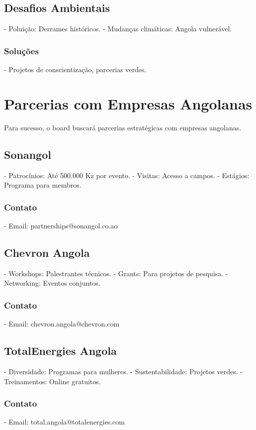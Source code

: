 \documentclass[12pt]{article}
\begin{document}
\subsection{Desafios Ambientais}
- Poluição: Derrames históricos.
- Mudanças climáticas: Angola vulnerável.

\subsubsection{Soluções}
- Projetos de conscientização, parcerias verdes.

\section{Parcerias com Empresas Angolanas}

Para sucesso, o board buscará parcerias estratégicas com empresas angolanas.

\subsection{Sonangol}
- Patrocínios: Até 500.000 Kz por evento.
- Visitas: Acesso a campos.
- Estágios: Programa para membros.

\subsubsection{Contato}
- Email: partnerships@sonangol.co.ao

\subsection{Chevron Angola}
- Workshops: Palestrantes técnicos.
- Grants: Para projetos de pesquisa.
- Networking: Eventos conjuntos.

\subsubsection{Contato}
- Email: chevron.angola@chevron.com

\subsection{TotalEnergies Angola}
- Diversidade: Programas para mulheres.
- Sustentabilidade: Projetos verdes.
- Treinamentos: Online gratuitos.

\subsubsection{Contato}
- Email: total.angola@totalenergies.com
\end{document}

